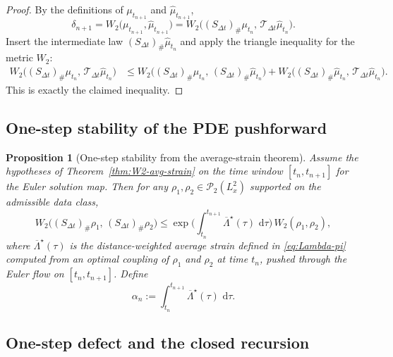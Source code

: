 \documentclass{article}
\numberwithin{equation}{section}
\theoremstyle{plain}
\newtheorem{proposition}[theorem]{Proposition}
\theoremstyle{definition}
\theoremstyle{remark}
\newcommand{\Pcal}{\mathcal{P}}
\newcommand{\dd}{\,\mathrm{d}}
\begin{document}
\begin{proof}
By the definitions of $\mu_{t_{n+1}}$ and $\widehat\mu_{t_{n+1}}$,
\[
\delta_{n+1}
=
W_2\big(\mu_{t_{n+1}},\widehat\mu_{t_{n+1}}\big)
=
W_2\big((S_{\Delta t})_\#\mu_{t_n},\,\mathcal T_{\Delta t}\widehat\mu_{t_n}\big).
\]
Insert the intermediate law $(S_{\Delta t})_\#\widehat\mu_{t_n}$ and apply the triangle inequality
for the metric $W_2$:
\begin{align*}
W_2\big((S_{\Delta t})_\#\mu_{t_n},\,\mathcal T_{\Delta t}\widehat\mu_{t_n}\big)
&\le
W_2\big((S_{\Delta t})_\#\mu_{t_n},\,(S_{\Delta t})_\#\widehat\mu_{t_n}\big)
+
W_2\big((S_{\Delta t})_\#\widehat\mu_{t_n},\,\mathcal T_{\Delta t}\widehat\mu_{t_n}\big).
\end{align*}
This is exactly the claimed inequality.
\end{proof}



\subsection{One-step stability of the PDE pushforward}

\begin{proposition}[One-step stability from the average-strain theorem]\label{prop:pde-stability-step}
Assume the hypotheses of Theorem~\ref{thm:W2-avg-strain} on the time window $[t_n,t_{n+1}]$ for the Euler solution map.
Then for any $\rho_1,\rho_2\in\Pcal_2(L^2_x)$ supported on the admissible data class,
\[
W_2\big((S_{\Delta t})_\#\rho_1,\,(S_{\Delta t})_\#\rho_2\big)
\le
\exp\!\Big(\int_{t_n}^{t_{n+1}}\overline\Lambda^\star(\tau)\,\dd\tau\Big)\,
W_2(\rho_1,\rho_2),
\]
where $\overline\Lambda^\star(\tau)$ is the distance-weighted average strain defined in \eqref{eq:Lambda-pi}
computed from an optimal coupling of $\rho_1$ and $\rho_2$ at time $t_n$, pushed through the Euler flow on $[t_n,t_{n+1}]$.
Define
\[
\alpha_n:=\int_{t_n}^{t_{n+1}}\overline\Lambda^\star(\tau)\,\dd\tau.
\]
\end{proposition}


\subsection{One-step defect and the closed recursion}
\end{document}
